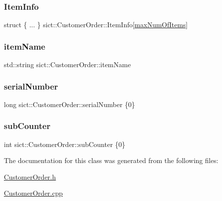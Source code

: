 \subsubsection{\texorpdfstring{ItemInfo}{ItemInfo}}
{\footnotesize\ttfamily struct \{ ... \}   sict\+::\+Customer\+Order\+::\+Item\+Info\mbox{[}\mbox{\hyperlink{namespacesict_a013c6a3783ee25d56c3428256fbea776}{max\+Num\+Of\+Items}}\mbox{]}\hspace{0.3cm}{\ttfamily [private]}}

\mbox{\label{classsict_1_1CustomerOrder_a9f793b8145c109006bdd2e0b69bc0bde}} 
\subsubsection{\texorpdfstring{itemName}{itemName}}
{\footnotesize\ttfamily std\+::string sict\+::\+Customer\+Order\+::item\+Name}

\mbox{\label{classsict_1_1CustomerOrder_a5321848f09f30cc02d7652346ab89eca}} 
\subsubsection{\texorpdfstring{serialNumber}{serialNumber}}
{\footnotesize\ttfamily long sict\+::\+Customer\+Order\+::serial\+Number \{0\}}

\mbox{\label{classsict_1_1CustomerOrder_a52bdf9922af30efda2b5211f70989ff8}} 
\subsubsection{\texorpdfstring{subCounter}{subCounter}}
{\footnotesize\ttfamily int sict\+::\+Customer\+Order\+::sub\+Counter \{0\}\hspace{0.3cm}{\ttfamily [private]}}



The documentation for this class was generated from the following files\+:\begin{DoxyCompactItemize}
\item 
\mbox{\hyperlink{CustomerOrder_8h}{Customer\+Order.\+h}}\item 
\mbox{\hyperlink{CustomerOrder_8cpp}{Customer\+Order.\+cpp}}\end{DoxyCompactItemize}
